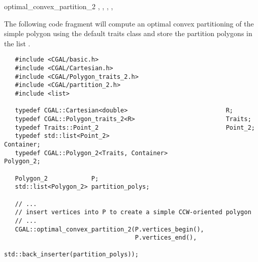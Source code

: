 \begin{ccRefFunction}{optimal_convex_partition_2}
\ccSeeAlso
{},
,
,
,


\ccExample


The following code fragment will compute an optimal
convex partitioning of the simple polygon  using the default
traits class and store the partition polygons in the list 
.

\begin{verbatim}
   #include <CGAL/basic.h>
   #include <CGAL/Cartesian.h>
   #include <CGAL/Polygon_traits_2.h>
   #include <CGAL/partition_2.h>
   #include <list>

   typedef CGAL::Cartesian<double>                           R;
   typedef CGAL::Polygon_traits_2<R>                         Traits;
   typedef Traits::Point_2                                   Point_2;
   typedef std::list<Point_2>                                Container;
   typedef CGAL::Polygon_2<Traits, Container>                Polygon_2;

   Polygon_2            P;
   std::list<Polygon_2> partition_polys;

   // ...
   // insert vertices into P to create a simple CCW-oriented polygon
   // ...
   CGAL::optimal_convex_partition_2(P.vertices_begin(),
                                    P.vertices_end(),
                                    std::back_inserter(partition_polys));
\end{verbatim}


\end{ccRefFunction}
